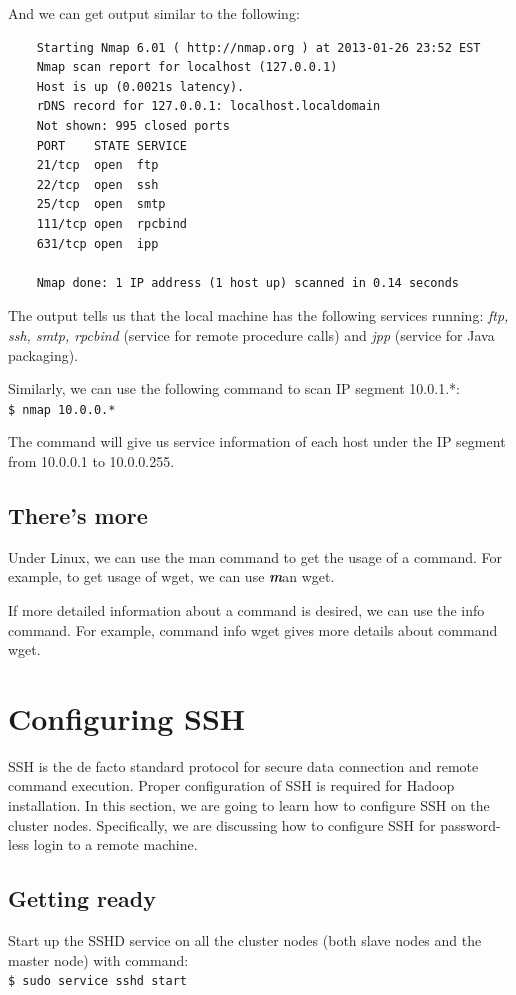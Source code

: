 And we can get output similar to the following:
\begin{verbatim}
    Starting Nmap 6.01 ( http://nmap.org ) at 2013-01-26 23:52 EST
    Nmap scan report for localhost (127.0.0.1)
    Host is up (0.0021s latency).
    rDNS record for 127.0.0.1: localhost.localdomain
    Not shown: 995 closed ports
    PORT    STATE SERVICE
    21/tcp  open  ftp
    22/tcp  open  ssh
    25/tcp  open  smtp
    111/tcp open  rpcbind
    631/tcp open  ipp

    Nmap done: 1 IP address (1 host up) scanned in 0.14 seconds
\end{verbatim}

The output tells us that the local machine has the following services running: \emph{ftp, ssh, smtp, rpcbind} (service for remote procedure calls) and \emph{jpp} (service for Java packaging).

Similarly, we can use the following command to scan IP segment 10.0.1.*: \\
\verb|$ nmap 10.0.0.*|

The command will give us service information of each host under the IP segment from 10.0.0.1 to 10.0.0.255.

\subsection*{There's more}
Under Linux, we can use the man command to get the usage of a command. For example, to get usage of wget, we can use {\emph \textbf man wget}.

If more detailed information about a command is desired, we can use the info command. For example, command info wget gives more details about command wget.

\section{Configuring SSH}
SSH is the de facto standard protocol for secure data connection and remote command execution. Proper configuration of SSH is required for Hadoop installation. In this section, we are going to learn how to configure SSH on the cluster nodes. Specifically, we are discussing how to configure SSH for password-less login to a remote machine.

\subsection*{Getting ready}
Start up the SSHD service on all the cluster nodes (both slave nodes and the master node) with command: \\
\verb|$ sudo service sshd start|

